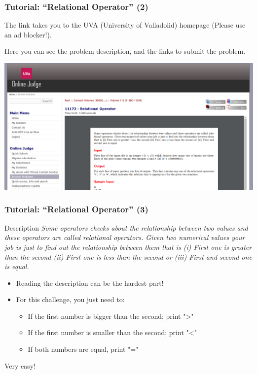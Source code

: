 \documentclass{beamer}
\begin{document}
\begin{frame}
  \frametitle{Tutorial: ``Relational Operator'' (2)}

  The link takes you to the UVA (University of Valladolid) homepage (\alert{Please use an ad blocker!}).

  \bigskip

  Here you can see the problem description, and the links to submit the problem.

  \begin{center}
    \includegraphics[width=.9\textwidth]{../img/relationaloperator}
  \end{center}
\end{frame}

\begin{frame}
  \frametitle{Tutorial: ``Relational Operator'' (3)}

  \begin{block}{Description}
    {\smaller \emph{
    Some operators checks about the relationship between two values and these
    operators are called relational operators. Given two numerical values \alert{your
    job is} just to find out the relationship between them that is (i) First one
    is greater than the second (ii) First one is less than the second or (iii)
    First and second one is equal.}}
  \end{block}

  \begin{itemize}
    \item Reading the description can be the hardest part!
    \item For this challenge, you just need to:
    \begin{itemize}
      \item If the first number is bigger than the second; print ">"
      \item If the first number is smaller than the second; print "<"
      \item If both numbers are equal, print "="
    \end{itemize}
  \end{itemize}
  Very easy!
\end{frame}
\end{document}
